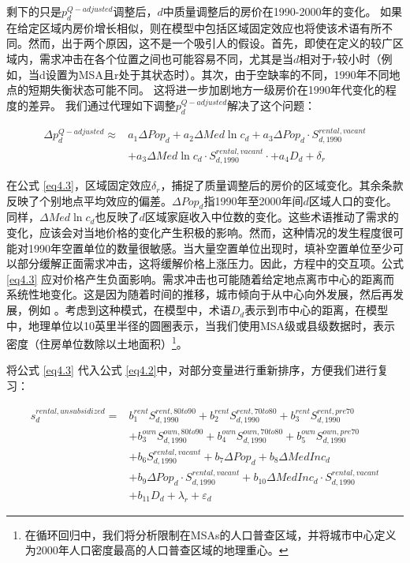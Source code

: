 \documentclass[lang=cn,11pt,a4paper]{paper}
\begin{document}
剩下的只是$p_{d}^{Q-adjusted}$调整后，$d$中质量调整后的房价在1990-2000年的变化。 如果在给定区域内房价增长相似，则在模型中包括区域固定效应也将使该术语有所不同。然而，出于两个原因，这不是一个吸引人的假设。首先，即使在定义的较广区域内，需求冲击在各个位置之间也可能容易不同，尤其是当$d$相对于$r$较小时（例如，当d设置为MSA且r处于其状态时）。其次，由于空缺率的不同，1990年不同地点的短期失衡状态可能不同。 这将进一步加剧地方一级房价在1990年代变化的程度的差异。 我们通过代理如下调整$p_{d}^{Q-adjusted}$解决了这个问题：

\begin{equation}
  \begin{aligned}
    \Delta p_{d}^{Q-adjusted} \approx & a_{1} \Delta Pop_{d}+a_{2} \Delta Med \ln c_{d}+a_{3} \Delta P o p_{d} \cdot S_{d, 1990}^{rental,vacant} \\
    &+a_{3} \Delta M e d \ln c_{d} \cdot S_{d, 1990}^{rental,vacant} \cdot+a_{4} D_{d}+\delta_{r}
    \end{aligned}
\end{equation}

在公式 \eqref{eq4.3}，区域固定效应$\delta_{r}$，捕捉了质量调整后的房价的区域变化。其余条款反映了个别地点平均效应的偏差。$\Delta Pop_{d}$指1990年至2000年间$d$区域人口的变化。同样，$\Delta Med \ln c_{d}$也反映了$d$区域家庭收入中位数的变化。这些术语推动了需求的变化，应该会对当地价格的变化产生积极的影响。然而，这种情况的发生程度很可能对1990年空置单位的数量很敏感。当大量空置单位出现时，填补空置单位至少可以部分缓解正面需求冲击，这将缓解价格上涨压力。因此，方程中的交互项。公式 \eqref{eq4.3} 应对价格产生负面影响。需求冲击也可能随着给定地点离市中心的距离而系统性地变化。这是因为随着时间的推移，城市倾向于从中心向外发展，然后再发展，例如 \cite{Brueckner2009725}。考虑到这种模式，在模型中，术语$D_d$表示到市中心的距离，在模型中，地理单位以10英里半径的圆圈表示，当我们使用MSA级或县级数据时，表示密度（住房单位数除以土地面积）\!\footnote{在循环回归中，我们将分析限制在MSAs的人口普查区域，并将城市中心定义为2000年人口密度最高的人口普查区域的地理重心。}。

将公式 \eqref{eq4.3} 代入公式 \eqref{eq4.2}中，对部分变量进行重新排序，方便我们进行复习：

\begin{equation}\label{eq4.4}
  \begin{aligned}
    s_{d}^{rental, unsubsidized}=& b_{1}^{rent} S_{d, 1990}^{rent, 80 t o 90}+b_{2}^{rent} S_{d, 1990}^{rent, 70 t o 80}+b_{3}^{rent} S_{d, 1990}^{rent, p r e 70} \\
    &+b_{3}^{own} S_{d, 1990}^{own, 80 t o 90}+b_{4}^{own} S_{d, 1990}^{own, 70 t o 80}+b_{5}^{own} S_{d, 1990}^{own, p r e 70} \\
    &+b_{6} S_{d, 1990}^{rent a l, vacant}+b_{7} \Delta P o p_{d}+b_{8} \Delta MedInc_{d} \\
    &+b_{9} \Delta Po p_{d} \cdot S_{d, 1990}^{rental, vacant}+b_{10} \Delta MedInc_{d} \cdot S_{d, 1990}^{rent a l, vacant} \\
    &+b_{11} D_{d}+\lambda_{r}+\varepsilon_{d}
    \end{aligned}
\end{equation}
\end{document}
